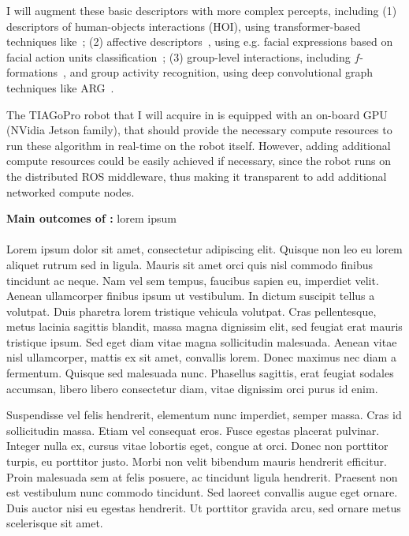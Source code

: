 I will augment these basic descriptors with more complex percepts, including
(1) descriptors of human-objects interactions (HOI), using transformer-based
techniques like~\cite{iftekhar2022what}; (2) affective
descriptors~\cite{vinciarelli2009social}, using e.g. facial expressions based
on facial action units classification~\cite{martinez2019automatic}; (3)
group-level interactions, including $f$-formations~\cite{setti2015fformation},
and group activity recognition, using deep convolutional graph techniques like
ARG~\cite{wu2019learning}.

The TIAGoPro robot that I will acquire in \project is equipped with an on-board
GPU (NVidia Jetson family), that should provide the necessary compute resources
to run these algorithm in real-time on the robot itself. However, adding
additional compute resources could be easily achieved if necessary, since the
robot runs on the distributed ROS middleware, thus making it transparent to add
additional networked compute nodes.

\begin{framed}
    {\noindent\bf Main outcomes of \tCA:} lorem ipsum 
\end{framed}

\paragraph{\TCB}

\begin{rewrite}
Lorem ipsum dolor sit amet, consectetur adipiscing elit. Quisque non leo eu
lorem aliquet rutrum sed in ligula. Mauris sit amet orci quis nisl commodo
finibus tincidunt ac neque. Nam vel sem tempus, faucibus sapien eu,
imperdiet velit. Aenean ullamcorper finibus ipsum ut vestibulum. In dictum
suscipit tellus a volutpat. Duis pharetra lorem tristique vehicula volutpat.
Cras pellentesque, metus lacinia sagittis blandit, massa magna dignissim
elit, sed feugiat erat mauris tristique ipsum. Sed eget diam vitae magna
sollicitudin malesuada. Aenean vitae nisl ullamcorper, mattis ex sit amet,
convallis lorem. Donec maximus nec diam a fermentum. Quisque sed malesuada
nunc. Phasellus sagittis, erat feugiat sodales accumsan, libero libero
consectetur diam, vitae dignissim orci purus id enim.

Suspendisse vel felis hendrerit, elementum nunc imperdiet, semper massa. Cras id
sollicitudin massa. Etiam vel consequat eros. Fusce egestas placerat
pulvinar. Integer nulla ex, cursus vitae lobortis eget, congue at orci.
Donec non porttitor turpis, eu porttitor justo. Morbi non velit bibendum
mauris hendrerit efficitur. Proin malesuada sem at felis posuere, ac
tincidunt ligula hendrerit. Praesent non est vestibulum nunc commodo
tincidunt. Sed laoreet convallis augue eget ornare. Duis auctor nisi eu
egestas hendrerit. Ut porttitor gravida arcu, sed ornare metus scelerisque
sit amet. 
\end{rewrite}



